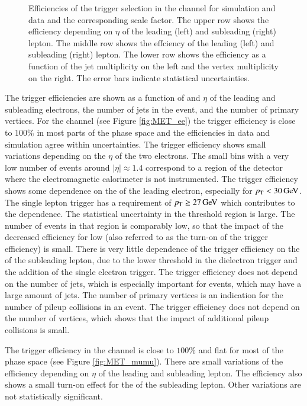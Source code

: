 \begin{figure}[htbp!]
\begin{center}
      \caption{Efficiencies of the trigger selection in the \emu channel for simulation and data and the corresponding scale factor. The upper row shows the efficiency depending on $\eta$ of the leading (left) and subleading (right) lepton. The middle row shows the effciency \pt of the leading (left) and subleading (right) lepton. The lower row shows the efficiency as a function of the jet multiplicity on the left and the vertex multiplicity on the right.
      The error bars indicate statistical uncertainties. }  
      
    \label{fig:MET_emu}
  \end{center}
\end{figure}

The trigger efficiencies are shown as a function of \pt and $\eta$ of the leading and subleading electrons, the number of jets in the event, and the number of primary vertices. 
For the \ee channel (see Figure \ref{fig:MET_ee}) the trigger efficiency is close to $100\%$ in most parts of the phase space and the efficiencies in data and simulation agree within uncertainties. The trigger efficiency shows small variations depending on the $\eta$ of the two electrons.
The small bins with a very low number of events around $|\eta| \approx 1.4$ correspond to a region of the detector where the electromagnetic calorimeter is not instrumented.
The trigger efficiency shows some dependence on the \pt of the leading electron, especially for $p_{\mathrm{T}}<30\,\text{Ge\hspace{-.08em}V}$. The single lepton trigger has a requirement of $p_{\mathrm{T}} \geq 27 \,\text{Ge\hspace{-.08em}V}$ which contributes to the \pt dependence.
The statistical uncertainty in the threshold region is large. The number of \ttbar events in that region is comparably low, so that the impact of the decreased efficiency for low \pt (also referred to as the turn-on of the trigger efficiency) is small. 
There is very little dependence of the trigger efficiency on the \pt of the subleading lepton, due to the lower threshold in the dielectron trigger and the addition of the single electron trigger.
The trigger efficiency does not depend on the number of jets, which is especially important for \ttbar events, which may have a large amount of jets.
The number of primary vertices is an indication for the number of pileup collisions in an event. The trigger efficiency does not depend on the number of vertices,
which shows that the impact of additional pileup collisions is small.

The trigger efficiency in the \mumu channel is close to $100\%$ and flat for most of the phase space (see Figure \ref{fig:MET_mumu}). There are small variations of the efficiency depending on $\eta$ of the leading and subleading
lepton. The efficiency also shows a small turn-on effect for the \pt of the subleading lepton. Other variations are not statistically significant.

